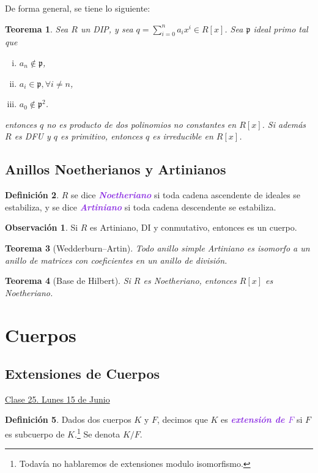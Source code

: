 \documentclass{article}
\newtheorem{theorem}{Teorema}[subsection]
\theoremstyle{definition}
\newtheorem{definition}[theorem]{Definición}
\newtheorem*{obs}{Observación}
\theoremstyle{remark}
\numberwithin{equation}{section}
\newcommand{\wea}[1]{\textcolor{BlueViolet}{\textbf{\emph{#1}}}}
\newcommand{\fecha}[1]{\begin{flushright} \underline{#1} \end{flushright}}
\begin{document}
De forma general, se tiene lo siguiente:
\begin{theorem}
  Sea $R$ un DIP, y sea $q = \sum_{i=0}^n a_i x^i \in R[x]$. Sea $\mathfrak{p}$ ideal primo tal que
  \begin{enumerate}[(i)]
    \item $a_n \notin \mathfrak p$,
    \item $a_i \in \mathfrak{p}, \forall i \neq n$,
    \item $a_0 \notin \mathfrak{p}^2$.
  \end{enumerate}
  entonces $q$ no es producto de dos polinomios no constantes en $R[x]$.
  Si además $R$ es DFU y $q$ es primitivo, entonces $q$ es irreducible en $R[x]$.
\end{theorem}

\subsection{Anillos Noetherianos y Artinianos}

\begin{definition}
  $R$ se dice \wea{Noetheriano} si toda cadena ascendente de ideales se estabiliza, y se dice \wea{Artiniano} si toda cadena descendente se estabiliza.
\end{definition}

\begin{obs}
  Si $R$ es Artiniano, DI y conmutativo, entonces es un cuerpo.
\end{obs}

\begin{theorem}
  [Wedderburn--Artin]
  Todo anillo simple Artiniano es isomorfo a un anillo de matrices con coeficientes en un anillo de división.
\end{theorem}

\begin{theorem}
  [Base de Hilbert]
  Si $R$ es Noetheriano, entonces $R[x]$ es Noetheriano.
\end{theorem}

\newpage
\section{Cuerpos}
\subsection{Extensiones de Cuerpos}
\fecha{Clase 25. Lunes 15 de Junio}

\begin{definition}
  Dados dos cuerpos $K$ y $F$, decimos que $K$ es \wea{extensión de $F$} si $F$ es subcuerpo de $K$.\footnote{Todavía no hablaremos de extensiones modulo isomorfismo.}
  Se denota $K/F$.
\end{definition}
\end{document}
